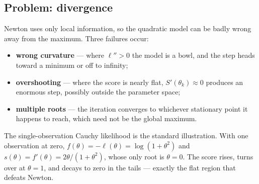 \documentclass[
  letterpaper,
  DIV=11,
  numbers=noendperiod]{scrreprt}
\providecommand{\tightlist}{%
  \setlength{\itemsep}{0pt}\setlength{\parskip}{0pt}}
\begin{document}
\subsection{Problem: divergence}\label{problem-divergence}

Newton uses only local information, so the quadratic model can be badly
wrong away from the maximum. Three failures occur:

\begin{itemize}
\tightlist
\item
  \textbf{wrong curvature} --- where \(\ell'' > 0\) the model is a bowl,
  and the step heads toward a minimum or off to infinity;
\item
  \textbf{overshooting} --- where the score is nearly flat,
  \(S'(\theta_k) \approx 0\) produces an enormous step, possibly outside
  the parameter space;
\item
  \textbf{multiple roots} --- the iteration converges to whichever
  stationary point it happens to reach, which need not be the global
  maximum.
\end{itemize}

The single-observation Cauchy likelihood is the standard illustration.
With one observation at zero,
\(f(\theta) = -\ell(\theta) = \log(1 + \theta^{2})\) and
\(s(\theta) = f'(\theta) = 2\theta/(1 + \theta^{2})\), whose only root
is \(\theta = 0\). The score rises, turns over at \(\theta = 1\), and
decays to zero in the tails --- exactly the flat region that defeats
Newton.
\end{document}
